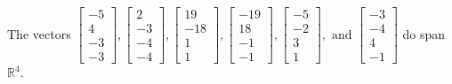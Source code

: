 \begin{exercise}
\begin{exerciseStatement}
  \end{exerciseStatement}
  \begin{exerciseAnswer}
   The vectors \(\left[\begin{array}{r}
-5 \\
4 \\
-3 \\
-3
\end{array}\right] , \left[\begin{array}{r}
2 \\
-3 \\
-4 \\
-4
\end{array}\right] , \left[\begin{array}{r}
19 \\
-18 \\
1 \\
1
\end{array}\right] , \left[\begin{array}{r}
-19 \\
18 \\
-1 \\
-1
\end{array}\right] , \left[\begin{array}{r}
-5 \\
-2 \\
3 \\
1
\end{array}\right] , \text{ and } \left[\begin{array}{r}
-3 \\
-4 \\
4 \\
-1
\end{array}\right]\) 
  	 do  
	span \(\mathbb{R}^4\).
  


  \end{exerciseAnswer}
\end{exercise}